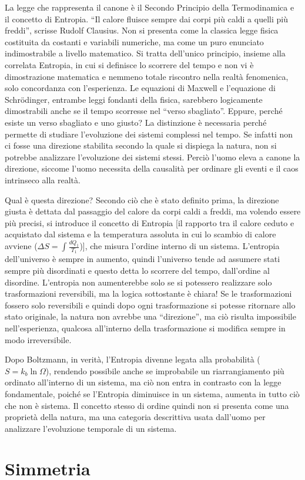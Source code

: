 \documentclass[11pt,a4paper]{article}
\begin{document}
La legge che rappresenta il canone è il Secondo Principio della Termodinamica e il concetto di Entropia. “Il calore fluisce sempre dai corpi più caldi a quelli più freddi”, scrisse Rudolf Clausius. Non si presenta come la classica legge fisica costituita da costanti e variabili numeriche, ma come un puro enunciato indimostrabile a livello matematico. Si tratta dell’unico principio, insieme alla correlata Entropia, in cui si definisce lo scorrere del tempo e non vi è dimostrazione matematica e nemmeno totale riscontro nella realtà fenomenica, solo concordanza con l’esperienza. Le equazioni di Maxwell e l’equazione di Schrödinger, entrambe leggi fondanti della fisica, sarebbero logicamente dimostrabili anche se il tempo scorresse nel “verso sbagliato”. Eppure, perché esiste un verso sbagliato e uno giusto? La distinzione è necessaria perché permette di studiare l’evoluzione dei sistemi complessi nel tempo. Se infatti non ci fosse una direzione stabilita secondo la quale si dispiega la natura, non si potrebbe analizzare l’evoluzione dei sistemi stessi. Perciò l’uomo eleva a canone la direzione, siccome l’uomo necessita della causalità per ordinare gli eventi e il caos intrinseco alla realtà. 

Qual è questa direzione? Secondo ciò che è stato definito prima, la direzione giusta è dettata dal passaggio del calore da corpi caldi a freddi, ma volendo essere più precisi, si introduce il concetto di Entropia [il rapporto tra il calore ceduto e acquistato dal sistema e la temperatura assoluta in cui lo scambio di calore avviene ($\Delta S=\int \frac{dQ_1}{T_1}$)], che misura l’ordine interno di un sistema. L’entropia dell’universo è sempre in aumento, quindi l’universo tende ad assumere stati sempre più disordinati e questo detta lo scorrere del tempo, dall’ordine al disordine. L’entropia non aumenterebbe solo se si potessero realizzare solo trasformazioni reversibili, ma la logica sottostante è chiara! Se le trasformazioni fossero solo reversibili e quindi dopo ogni trasformazione si potesse ritornare allo stato originale, la natura non avrebbe una “direzione”, ma ciò risulta impossibile nell’esperienza, qualcosa all’interno della trasformazione si modifica sempre in modo irreversibile. 

Dopo Boltzmann, in verità, l’Entropia divenne legata alla probabilità ($S=k_b\ln\Omega$), rendendo possibile anche se improbabile un riarrangiamento più ordinato all’interno di un sistema, ma ciò non entra in contrasto con la legge fondamentale, poiché se l’Entropia diminuisce in un sistema, aumenta in tutto ciò che non è sistema. Il concetto stesso di ordine quindi non si presenta come una proprietà della natura, ma una categoria descrittiva usata dall’uomo per analizzare l’evoluzione temporale di un sistema. \section{Simmetria}
\end{document}
